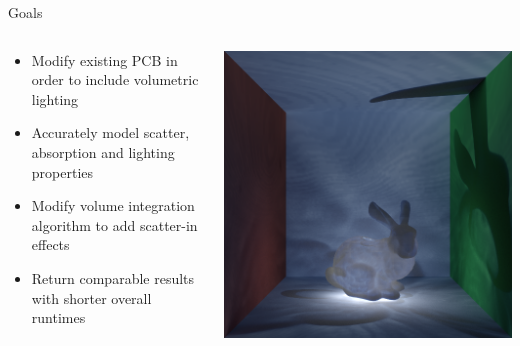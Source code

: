 \documentclass[10pt,compress,professionalfont]{beamer}
\begin{document}
\begin{frame}{Goals}

    \begin{columns}
        \begin{column}{0.5\textwidth}

            \vspace{-4mm}
            \begin{itemize}
                \item Modify existing PCB in order to include volumetric lighting\\ \vspace{2mm}
                \item Accurately model scatter, absorption and lighting properties\\ \vspace{2mm}
                \item Modify volume integration algorithm to add scatter-in effects\\ \vspace{2mm}
                \item Return comparable results with shorter overall runtimes
            \end{itemize}
        \end{column}
        \begin{column}{0.5\textwidth}
            \includegraphics[width=\textwidth]{../img/bunny_glow}
        \end{column}
    \end{columns}

\end{frame}
\end{document}
